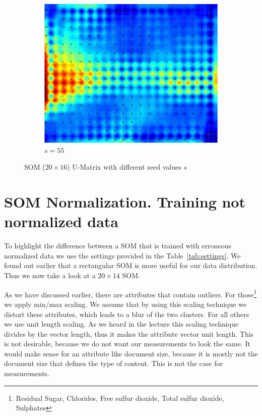\documentclass{acm_proc_article-sp}
\begin{document}
\begin{figure}
    \begin{subfigure}[b]{0.30\linewidth}
        \includegraphics[width=\linewidth]{img/wine-newmid-u-matrix-seed-55}
        \caption{$s=55$}
        \label{fig:wine-newmid-u-matrix-seed-55}
    \end{subfigure}
    \caption{SOM ($20\times16$) U-Matrix with different seed values $s$}
    \label{fig:wine-newmid-u-matrix-seed}
\end{figure}

\section{SOM Normalization. Training not normalized data}

To highlight the difference between a SOM that is trained with erroneous normalized data
we use the settings provided in the Table~\ref{tab:settings}. We found out earlier that a rectangular
SOM is more useful for our data distribution. Thus we now take a look at a $20\times14$ SOM.

As we have discussed earlier, there are attributes that contain outliers.
For those\footnote{Residual Sugar, Chlorides, Free sulfur dioxide, Total sulfur dioxide, Sulphates} we apply min/max scaling. We assume that by using this scaling technique we distort these attributes, which leads to a blur of the two clusters.
For all others we use unit length scaling. As we heard in the lecture this scaling technique
divides by the vector length, thus it makes the attribute vector unit length. This is
not desirable, because we do not want our measurements to look the same. It would
make sense for an attribute like document size, because it is mostly not the document
size that defines the type of content. This is not the case for measurements.
\end{document}
